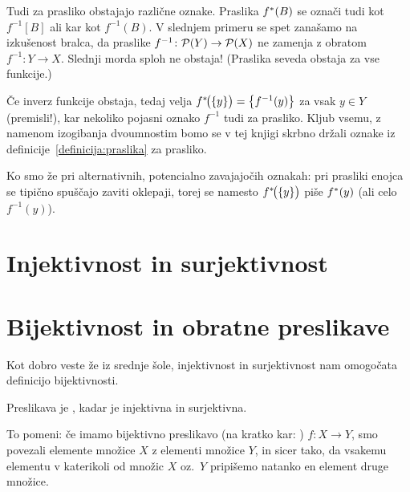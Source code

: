                 \begin{opomba}
                        Tudi za prasliko obstajajo različne oznake. Praslika $\pim{f}{B}$ se označi tudi kot $f^{-1}[B]$ ali kar kot $f^{-1}(B)$. V slednjem primeru se spet zanašamo na izkušenost bralca, da praslike $f^{-1}\colon \mathcal{P}(Y) \to \mathcal{P}(X)$ ne zamenja z obratom $f^{-1}\colon Y \to X$. Slednji morda sploh ne obstaja! (Praslika seveda obstaja za vse funkcije.)

                        Če inverz funkcije obstaja, tedaj velja $\pim[1]{f}{\set{y}} = \set[1]{f^{-1}(y)}$ za vsak $y \in Y$ (premisli!), kar nekoliko pojasni oznako $f^{-1}$ tudi za prasliko. Kljub vsemu, z namenom izogibanja dvoumnostim bomo se v tej knjigi skrbno držali oznake iz definicije~\ref{definicija:praslika} za prasliko.

                        Ko smo že pri alternativnih, potencialno zavajajočih oznakah: pri prasliki enojca se tipično spuščajo zaviti oklepaji, torej se namesto $\pim[1]{f}{\set{y}}$ piše $\pim{f}{y}$ (ali celo $f^{-1}(y)$).
                \end{opomba}




        \section{Injektivnost in surjektivnost}\label{razdelek:injektivnost-in-surjektivnost}



        \section{Bijektivnost in obratne preslikave}\label{razdelek:bijektivnost-in-obratne-preslikave}

                Kot dobro veste že iz srednje šole, injektivnost in surjektivnost nam omogočata definicijo bijektivnosti.

                \begin{definicija}
                        Preslikava je , kadar je injektivna in surjektivna.
                \end{definicija}

                To pomeni: če imamo bijektivno preslikavo (na kratko kar: ) $f\colon X \to Y$, smo povezali elemente množice $X$ z elementi množice $Y$, in sicer tako, da vsakemu elementu v katerikoli od množic $X$ oz.~$Y$ pripišemo natanko en element druge množice.

